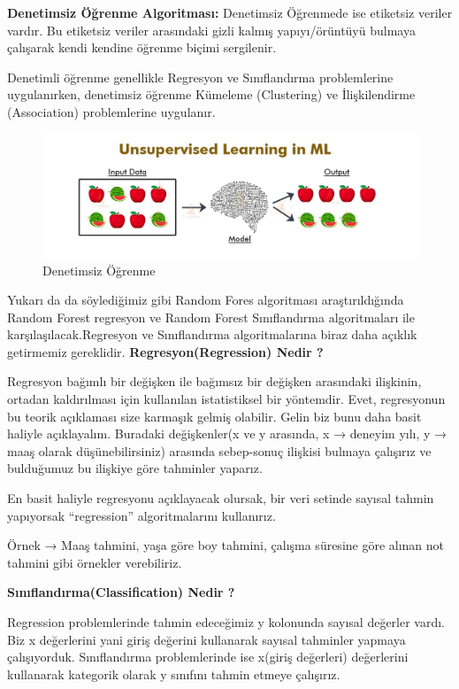 \documentclass[12pt, a4paper]{article}
\begin{document}
\textbf{Denetimsiz Öğrenme Algoritması:} Denetimsiz Öğrenmede ise etiketsiz veriler vardır. Bu etiketsiz veriler arasındaki gizli kalmış yapıyı/örüntüyü bulmaya çalışarak kendi kendine öğrenme biçimi sergilenir.\newline

Denetimli öğrenme genellikle Regresyon ve Sınıflandırma problemlerine uygulanırken, denetimsiz öğrenme Kümeleme (Clustering) ve İlişkilendirme (Association) problemlerine uygulanır.
\begin{figure}[!htbp] 
	\caption{ Denetimsiz Öğrenme  }
	\centering
	\includegraphics[angle=0, width=\textwidth]{resim2.png}
	
\end{figure} 
\newline
Yukarı da da söylediğimiz gibi Random Fores algoritması araştırıldığında Random Forest regresyon ve Random Forest Sınıflandırma algoritmaları ile karşılaşılacak.Regresyon ve Sınıflandırma algoritmalarına biraz daha açıklık getirmemiz gereklidir.\newline
\textbf{Regresyon(Regression) Nedir ?}


Regresyon bağımlı bir değişken ile bağımsız bir değişken arasındaki ilişkinin, ortadan kaldırılması için kullanılan istatistiksel bir yöntemdir. Evet, regresyonun bu teorik açıklaması size karmaşık gelmiş olabilir. Gelin biz bunu daha basit haliyle açıklayalım. Buradaki değişkenler(x ve y arasında, x → deneyim yılı, y → maaş olarak düşünebilirsiniz) arasında sebep-sonuç ilişkisi bulmaya çalışırız ve bulduğumuz bu ilişkiye göre tahminler yaparız.

En basit haliyle regresyonu açıklayacak olursak, bir veri setinde sayısal tahmin yapıyorsak “regression” algoritmalarını kullanırız.

Örnek → Maaş tahmini, yaşa göre boy tahmini, çalışma süresine göre alınan not tahmini gibi örnekler verebiliriz. \newline

\textbf{Sınıflandırma(Classification) Nedir ?}


Regression problemlerinde tahmin edeceğimiz y kolonunda sayısal değerler vardı. Biz x değerlerini yani giriş değerini kullanarak sayısal tahminler yapmaya çalışıyorduk. Sınıflandırma problemlerinde ise x(giriş değerleri) değerlerini kullanarak kategorik olarak y sınıfını tahmin etmeye çalışırız.\cite{site3}
\end{document}
